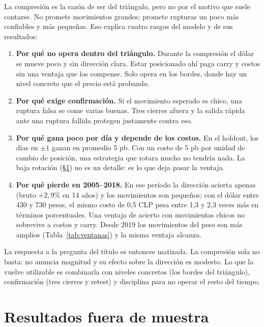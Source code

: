 \documentclass[10pt,a4paper]{article}
\begin{document}
La compresión es la razón de ser del triángulo, pero no por el motivo que suele
contarse. No promete movimientos grandes; promete rupturas un poco más confiables
y más pequeñas. Eso explica cuatro rasgos del modelo y de sus resultados:
\begin{enumerate}
  \item \textbf{Por qué no opera dentro del triángulo.} Durante la compresión el
        dólar se mueve poco y sin dirección clara. Estar posicionado ahí paga
        carry y costos sin una ventaja que los compense. Solo opera en los bordes,
        donde hay un nivel concreto que el precio está probando.
  \item \textbf{Por qué exige confirmación.} Si el movimiento esperado es chico,
        una ruptura falsa se come varias buenas. Tres cierres afuera y la salida
        rápida ante una ruptura fallida protegen justamente contra eso.
  \item \textbf{Por qué gana poco por día y depende de los costos.} En el holdout,
        los días en $\pm1$ ganan en promedio 5 pb. Con un costo de 5 pb por unidad
        de cambio de posición, una estrategia que rotara mucho no tendría nada.
        La baja rotación (§\ref{sec:resultados}) no es un detalle: es lo que deja
        pasar la ventaja.
  \item \textbf{Por qué pierde en 2005--2018.} En ese período la dirección acierta
        apenas (bruto $+2{,}9\%$ en 14 años) y los movimientos son pequeños; con
        el dólar entre 430 y 730 pesos, el mismo costo de 0,5 CLP pesa entre 1,3 y
        2,3 veces más en términos porcentuales. Una ventaja de acierto con movimientos chicos
        no sobrevive a costos y carry. Desde 2019 los movimientos del peso son más
        amplios (Tabla~\ref{tab:ventanas}) y la misma ventaja alcanza.
\end{enumerate}

La respuesta a la pregunta del título es entonces matizada. La compresión sola no
basta: no anuncia magnitud y su efecto sobre la dirección es modesto. Lo que la
vuelve utilizable es combinarla con niveles concretos (los bordes del triángulo),
confirmación (tres cierres y retest) y disciplina para no operar el resto del
tiempo.

\section{Resultados fuera de muestra}\label{sec:resultados}
\end{document}
